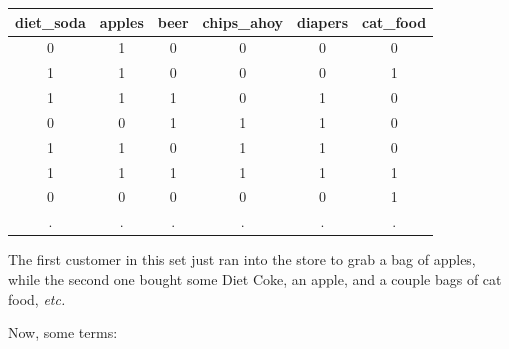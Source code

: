 \documentclass[12pt]{article}
\begin{document}
\begin{center}
\begin{tabular}{|c|c|c|c|c|c|}
\hline
diet\_soda & apples & beer & chips\_ahoy & diapers & cat\_food \\
\hline
0 & 1 & 0 & 0 & 0 & 0 \\
1 & 1 & 0 & 0 & 0 & 1 \\
1 & 1 & 1 & 0 & 1 & 0 \\
0 & 0 & 1 & 1 & 1 & 0 \\
1 & 1 & 0 & 1 & 1 & 0 \\
1 & 1 & 1 & 1 & 1 & 1 \\
0 & 0 & 0 & 0 & 0 & 1 \\
. & . & . & . & . & . \\
\hline
\end{tabular}
\end{center}

The first customer in this set just ran into the store to grab a bag of
apples, while the second one bought some Diet Coke, an apple, and a couple
bags of cat food, \textit{etc.}

\vspace{.1in}
Now, some terms:
\end{document}
